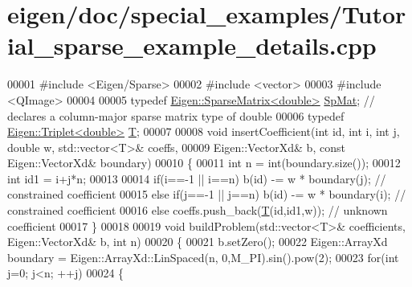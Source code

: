 \hypertarget{eigen_2doc_2special__examples_2_tutorial__sparse__example__details_8cpp_source}{}\section{eigen/doc/special\+\_\+examples/\+Tutorial\+\_\+sparse\+\_\+example\+\_\+details.cpp}
\label{eigen_2doc_2special__examples_2_tutorial__sparse__example__details_8cpp_source}

\begin{DoxyCode}
00001 \textcolor{preprocessor}{#include <Eigen/Sparse>}
00002 \textcolor{preprocessor}{#include <vector>}
00003 \textcolor{preprocessor}{#include <QImage>}
00004 
00005 \textcolor{keyword}{typedef} \hyperlink{group___sparse_core___module}{Eigen::SparseMatrix<double>} \hyperlink{group___sparse_core___module}{SpMat}; \textcolor{comment}{// declares a column-major
       sparse matrix type of double}
00006 \textcolor{keyword}{typedef} \hyperlink{group___sparse_core___module}{Eigen::Triplet<double>} \hyperlink{group___sparse_core___module_class_eigen_1_1_triplet}{T};
00007 
00008 \textcolor{keywordtype}{void} insertCoefficient(\textcolor{keywordtype}{int} \textcolor{keywordtype}{id}, \textcolor{keywordtype}{int} i, \textcolor{keywordtype}{int} j, \textcolor{keywordtype}{double} w, std::vector<T>& coeffs,
00009                        Eigen::VectorXd& b, \textcolor{keyword}{const} Eigen::VectorXd& boundary)
00010 \{
00011   \textcolor{keywordtype}{int} n = int(boundary.size());
00012   \textcolor{keywordtype}{int} id1 = i+j*n;
00013 
00014         \textcolor{keywordflow}{if}(i==-1 || i==n) b(\textcolor{keywordtype}{id}) -= w * boundary(j); \textcolor{comment}{// constrained coefficient}
00015   \textcolor{keywordflow}{else}  \textcolor{keywordflow}{if}(j==-1 || j==n) b(\textcolor{keywordtype}{id}) -= w * boundary(i); \textcolor{comment}{// constrained coefficient}
00016   \textcolor{keywordflow}{else}  coeffs.push\_back(\hyperlink{group___sparse_core___module_class_eigen_1_1_triplet}{T}(\textcolor{keywordtype}{id},id1,w));              \textcolor{comment}{// unknown coefficient}
00017 \}
00018 
00019 \textcolor{keywordtype}{void} buildProblem(std::vector<T>& coefficients, Eigen::VectorXd& b, \textcolor{keywordtype}{int} n)
00020 \{
00021   b.setZero();
00022   Eigen::ArrayXd boundary = Eigen::ArrayXd::LinSpaced(n, 0,M\_PI).sin().pow(2);
00023   \textcolor{keywordflow}{for}(\textcolor{keywordtype}{int} j=0; j<n; ++j)
00024   \{

\end{DoxyCode}

